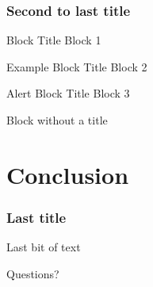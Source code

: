 \documentclass[
    11pt, %
    aspectratio=169, %
]{beamer}
\begin{document}
\begin{frame}
	\frametitle{Second to last title}
    	\begin{block}{Block Title}
    		Block 1
    	\end{block}

    	\begin{exampleblock}{Example Block Title}
    		Block 2
    	\end{exampleblock}

    	\begin{alertblock}{Alert Block Title}
    		Block 3
    	\end{alertblock}

    	\begin{block}{} %
    		Block without a title
    	\end{block}
\end{frame}

\section{Conclusion}
\begin{frame}
	\frametitle{Last title}

	Last bit of text

\end{frame}


\appendix
{}

\begin{frame}[noframenumbering] %

	\begin{center}
            {\LARGE Questions?}
	\end{center}

\end{frame}
\end{document}
